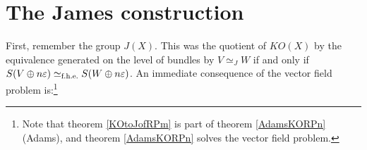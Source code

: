 

\section{The James construction} %
\label{TheJamesConstruction}
\ifx\OutputTheJamesConstruction\undefined\else
First, remember the group $J(X)$.  This was the quotient of $KO(X)$ by the equivalence generated on the level of bundles by $V \simeq_J W$ if and only if $S(V \oplus n \varepsilon) \simeq_\textup{f.h.e.} S(W \oplus n \varepsilon)$.  An immediate consequence of the vector field problem is:\footnote{Note that theorem \ref{KOtoJofRPm} is part of theorem \ref{AdamsKORPn} (Adams), and theorem \ref{AdamsKORPn} solves the vector field problem.}

